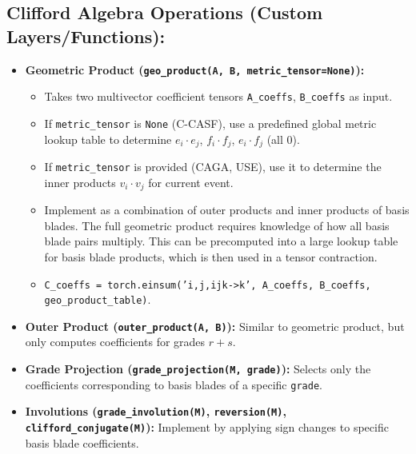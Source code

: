 \documentclass[11pt]{article}
\begin{document}
\subsection{Clifford Algebra Operations (Custom Layers/Functions):}
\begin{itemize}[noitemsep]
    \item \textbf{Geometric Product (\texttt{geo\_product(A, B, metric\_tensor=None)}):}
    \begin{itemize}[noitemsep]
        \item Takes two multivector coefficient tensors \texttt{A\_coeffs}, \texttt{B\_coeffs} as input.
        \item If \texttt{metric\_tensor} is \texttt{None} (C-CASF), use a predefined global metric lookup table to determine $e_i \cdot e_j$, $f_i \cdot f_j$, $e_i \cdot f_j$ (all 0).
        \item If \texttt{metric\_tensor} is provided (CAGA, USE), use it to determine the inner products $v_i \cdot v_j$ for current event.
        \item Implement as a combination of outer products and inner products of basis blades. The full geometric product requires knowledge of how all basis blade pairs multiply. This can be precomputed into a large lookup table for basis blade products, which is then used in a tensor contraction.
        \item \texttt{C\_coeffs = torch.einsum('i,j,ijk->k', A\_coeffs, B\_coeffs, geo\_product\_table)}.
    \end{itemize}
    \item \textbf{Outer Product (\texttt{outer\_product(A, B)}):} Similar to geometric product, but only computes coefficients for grades $r+s$.
    \item \textbf{Grade Projection (\texttt{grade\_projection(M, grade)}):} Selects only the coefficients corresponding to basis blades of a specific \texttt{grade}.
    \item \textbf{Involutions (\texttt{grade\_involution(M)}, \texttt{reversion(M)}, \texttt{clifford\_conjugate(M)}):} Implement by applying sign changes to specific basis blade coefficients.
\end{itemize}
\end{document}
